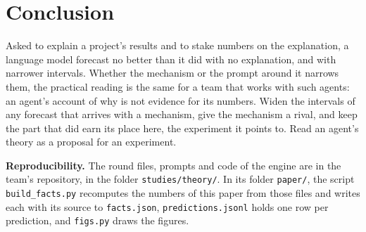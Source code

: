 \documentclass[10pt]{article}
\begin{document}
\section{Conclusion}

Asked to explain a project's results and to stake numbers on the explanation, a language model forecast no better
than it did with no explanation, and with narrower intervals. Whether the mechanism or the prompt around it
narrows them, the practical reading is the same for a team that works with such agents: an agent's account of
why is not evidence for its numbers. Widen the intervals of any forecast that arrives with a mechanism, give the
mechanism a rival, and keep the part that did earn its place here, the experiment it points to. Read an agent's
theory as a proposal for an experiment.

{\small\sloppy
\textbf{Reproducibility.} The round files, prompts and code of the engine are in the team's repository, in the
folder \texttt{studies/theory/}. In its folder \texttt{paper/}, the script \texttt{build\_facts.py} recomputes the numbers of
this paper from those files and writes each with its source to \texttt{facts.json}, \texttt{predictions.jsonl}
holds one row per prediction, and \texttt{figs.py} draws the figures.\par
}

{\footnotesize


}
\end{document}
